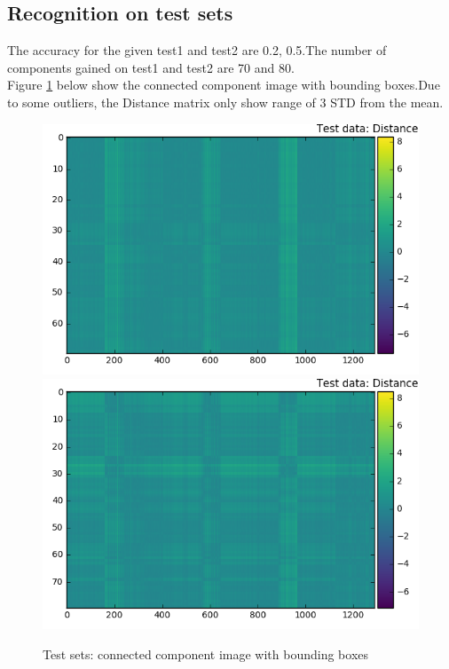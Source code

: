 \documentclass{extarticle}
\theoremstyle{definition}
\theoremstyle{definition}
\begin{document}
\subsection{Recognition on test sets}
The accuracy for the given test1 and test2 are 0.2, 0.5.The number of components gained on test1 and test2 are 70 and 80. \\
Figure \ref{figure3} below show the connected component image with bounding boxes.Due to some outliers, the Distance matrix only show range of 3 STD from the mean. \\
\begin{figure}[H]
	\includegraphics[width = 0.5\linewidth]{./figures/test1_Distance_Matrix_improve0.png}
	\includegraphics[width = 0.5\linewidth]{./figures/test2_Distance_Matrix_improve0.png}
	\caption{Test sets: connected component image with bounding boxes}
	\label{figure3}
\end{figure}
\end{document}

